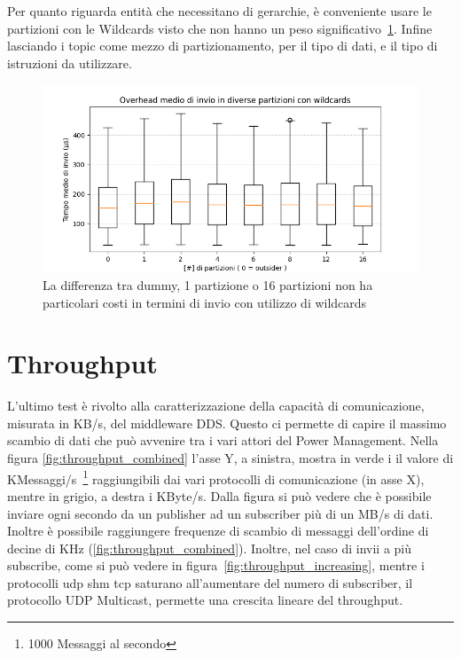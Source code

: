 Per quanto riguarda entità che necessitano di gerarchie, è conveniente usare le partizioni con le Wildcards visto che non hanno un peso significativo~\ref{fig:test2wildcards}. Infine lasciando i topic come mezzo di partizionamento, per il tipo di dati, e il tipo di istruzioni da utilizzare.

\begin{figure}[H]
    \centering
    \includegraphics[width=\textwidth]{./results/test2_wildcards.png}
    \caption{La differenza tra dummy, 1 partizione o 16 partizioni non ha particolari costi in termini di invio con utilizzo di wildcards}\label{fig:test2wildcards}
\end{figure}



\section{Throughput} %
L'ultimo test è rivolto alla caratterizzazione della capacità di comunicazione, misurata in KB/s, del middleware DDS. Questo ci permette di capire il massimo scambio di dati che può avvenire tra i vari attori del Power Management. Nella figura \ref{fig:throughput_combined} l'asse Y, a sinistra, mostra in verde i il valore di KMessaggi/s~\footnote{1000 Messaggi al secondo} raggiungibili dai vari protocolli di comunicazione (in asse X), mentre in grigio, a destra i KByte/s. Dalla figura si può vedere che è possibile inviare ogni secondo da un publisher ad un subscriber più di un MB/s di dati. Inoltre è possibile raggiungere frequenze di scambio di messaggi dell'ordine di decine di KHz (\ref{fig:throughput_combined}). Inoltre, nel caso di invii a più subscribe, come si può vedere in figura~\ref{fig:throughput_increasing}, mentre i protocolli udp shm tcp saturano all'aumentare del numero di subscriber, il protocollo UDP Multicast, permette una crescita lineare del throughput.


